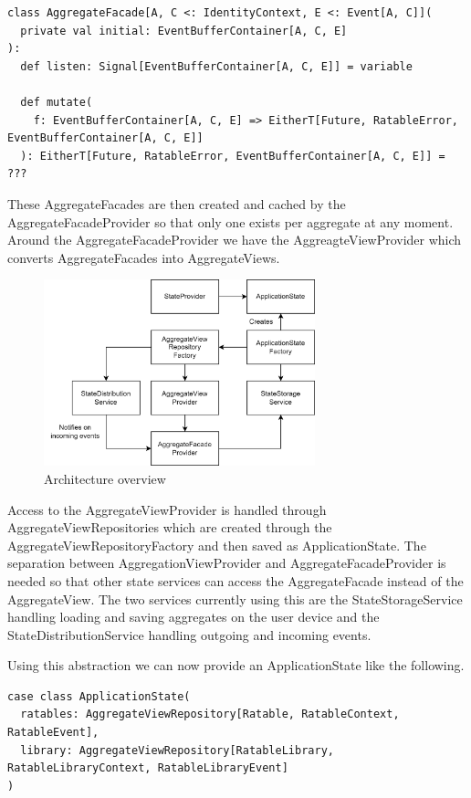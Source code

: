 \documentclass[
	ngerman,
	ruledheaders=section,   %
	class=report,		    %
	thesis={type=bachelor}, %
	accentcolor=9c,			%
	custommargins=true,    %
	marginpar=false,        %
	parskip=half-,          %
	fontsize=11pt,          %
]{tudapub}
\begin{document}
\begin{lstlisting}
class AggregateFacade[A, C <: IdentityContext, E <: Event[A, C]](
  private val initial: EventBufferContainer[A, C, E]
):
  def listen: Signal[EventBufferContainer[A, C, E]] = variable

  def mutate(
    f: EventBufferContainer[A, C, E] => EitherT[Future, RatableError, EventBufferContainer[A, C, E]]
  ): EitherT[Future, RatableError, EventBufferContainer[A, C, E]] = ???

\end{lstlisting}

These AggregateFacades are then created and cached by the AggregateFacadeProvider so that only one exists per aggregate at any moment. Around the AggregateFacadeProvider we have the AggreagteViewProvider which converts AggregateFacades into AggregateViews. 

\begin{figure}[h]
  \centering
  \includegraphics[width=0.7\textwidth]{state.png}
  \caption{Architecture overview}
\end{figure}

Access to the AggregateViewProvider is handled through AggregateViewRepositories which are created through the AggregateViewRepositoryFactory and then saved as ApplicationState. The separation between AggregationViewProvider and AggregateFacadeProvider is needed so that other state services can access the AggregateFacade instead of the AggregateView. The two services currently using this are the StateStorageService handling loading and saving aggregates on the user device and the StateDistributionService handling outgoing and incoming events. 

Using this abstraction we can now provide an ApplicationState like the following.

\begin{lstlisting}
case class ApplicationState(
  ratables: AggregateViewRepository[Ratable, RatableContext, RatableEvent],
  library: AggregateViewRepository[RatableLibrary, RatableLibraryContext, RatableLibraryEvent]
)
\end{lstlisting}
\end{document}
